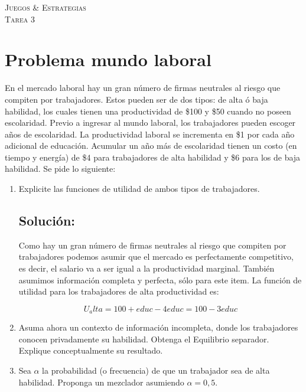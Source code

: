 \documentclass{exam}
\begin{document}
\begin{center}
\LARGE{{\textsc{Juegos \& Estrategias}}}\\
\Large{{\textsc{Tarea 3}}}
\end{center}

\hline{}{}
 \begin{flushleft}

\end{flushleft}
\hline{}{}


\section{Problema mundo laboral}

En el mercado laboral hay un gran número de firmas neutrales al riesgo que compiten por trabajadores. Estos pueden ser de dos tipos: de alta ó baja habilidad, los cuales tienen una productividad de \$100 y \$50 cuando no poseen escolaridad. Previo a ingresar al mundo laboral, los trabajadores pueden escoger años de escolaridad. La productividad laboral se incrementa en \$1 por cada año adicional de educación. Acumular un año más de escolaridad tienen un costo (en tiempo y energía) de \$4 para trabajadores de alta habilidad y \$6 para los de baja habilidad. Se pide lo siguiente:

\begin{enumerate}
    
\item Explicite las funciones de utilidad de ambos tipos de trabajadores.
 \subsection*{Solución:}
 
Como hay un gran número de firmas neutrales al riesgo que compiten por trabajadores podemos asumir que el mercado es perfectamente competitivo, es decir, el salario va a ser igual a la productividad
marginal. También asumimos información completa y perfecta, sólo para este item. La función de utilidad para los trabajadores de alta productividad es:

\begin{equation}
    U_alta=100+educ−4educ=100−3educ
    \label{fx utilidad para los trabajadores de alta productividad}
\end{equation}


\item Asuma ahora un contexto de información incompleta, donde los trabajadores conocen privadamente su habilidad. Obtenga el Equilibrio separador. Explique conceptualmente su resultado.

\item Sea $\alpha$ la probabilidad (o frecuencia) de que un trabajador sea de alta habilidad. Proponga un mezclador
asumiendo $\alpha= 0,5$.
\end{enumerate}
\end{document}
